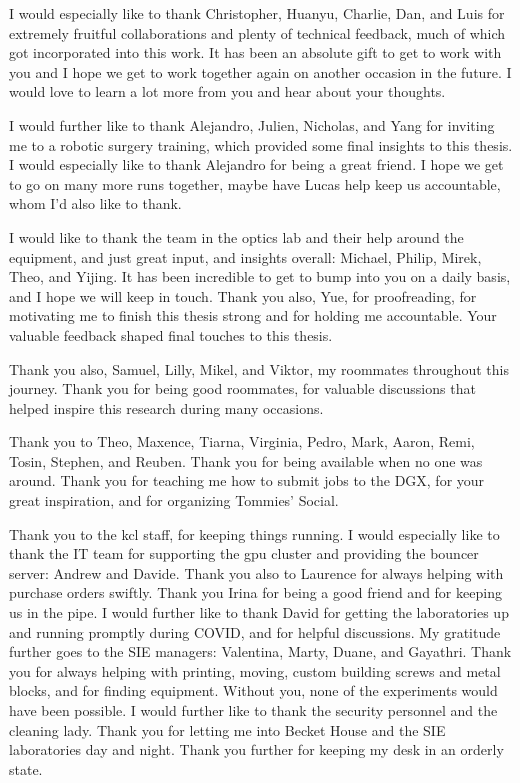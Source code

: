 I would especially like to thank Christopher, Huanyu, Charlie, Dan, and Luis for extremely fruitful collaborations and plenty of technical feedback, much of which got incorporated into this work. It has been an absolute gift to get to work with you and I hope we get to work together again on another occasion in the future. I would love to learn a lot more from you and hear about your thoughts.

I would further like to thank Alejandro, Julien, Nicholas, and Yang for inviting me to a robotic surgery training, which provided some final insights to this thesis. I would especially like to thank Alejandro for being a great friend. I hope we get to go on many more runs together, maybe have Lucas help keep us accountable, whom I'd also like to thank.

I would like to thank the team in the optics lab and their help around the equipment, and just great input, and insights overall: Michael, Philip, Mirek, Theo, and Yijing. It has been incredible to get to bump into you on a daily basis, and I hope we will keep in touch. Thank you also, Yue, for proofreading, for motivating me to finish this thesis strong and for holding me accountable. Your valuable feedback shaped final touches to this thesis.

Thank you also, Samuel, Lilly, Mikel, and Viktor, my roommates throughout this journey. Thank you for being good roommates, for valuable discussions that helped inspire this research during many occasions.

Thank you to Theo, Maxence, Tiarna, Virginia, Pedro, Mark, Aaron, Remi, Tosin, Stephen, and Reuben. Thank you for being available when no one was around. Thank you for teaching me how to submit jobs to the DGX, for your great inspiration, and for organizing Tommies' Social.

Thank you to the \gls{kcl} staff, for keeping things running. I would especially like to thank the IT team for supporting the \gls{gpu} cluster and providing the bouncer server: Andrew and Davide. Thank you also to Laurence for always helping with purchase orders swiftly. Thank you Irina for being a good friend and for keeping us in the pipe. I would further like to thank David for getting the laboratories up and running promptly during COVID, and for helpful discussions. My gratitude further goes to the SIE managers: Valentina, Marty, Duane, and Gayathri. Thank you for always helping with printing, moving, custom building screws and metal blocks, and for finding equipment. Without you, none of the experiments would have been possible. I would further like to thank the security personnel and the cleaning lady. Thank you for letting me into Becket House and the SIE laboratories day and night. Thank you further for keeping my desk in an orderly state.

